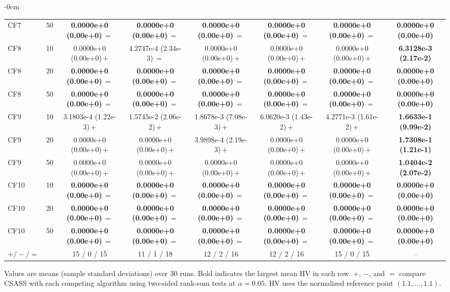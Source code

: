 \begin{table}[!htbp]
\begin{ROneBlock}
\begin{adjustwidth}{-\extralength}{0cm}
\begin{tabular*}{\linewidth}{@{\extracolsep{\fill}}llcccccc@{}}
CF7 & 50 & \textbf{0.0000e+0 (0.00e+0)}\,$=$ & \textbf{0.0000e+0 (0.00e+0)}\,$=$ & \textbf{0.0000e+0 (0.00e+0)}\,$=$ & \textbf{0.0000e+0 (0.00e+0)}\,$=$ & \textbf{0.0000e+0 (0.00e+0)}\,$=$ & \textbf{0.0000e+0 (0.00e+0)} \\
CF8 & 10 & 0.0000e+0 (0.00e+0)\,$+$ & 4.2747e-4 (2.34e-3)\,$=$ & 0.0000e+0 (0.00e+0)\,$+$ & 0.0000e+0 (0.00e+0)\,$+$ & 0.0000e+0 (0.00e+0)\,$+$ & \textbf{6.3128e-3 (2.17e-2)} \\
CF8 & 20 & \textbf{0.0000e+0 (0.00e+0)}\,$=$ & \textbf{0.0000e+0 (0.00e+0)}\,$=$ & \textbf{0.0000e+0 (0.00e+0)}\,$=$ & \textbf{0.0000e+0 (0.00e+0)}\,$=$ & \textbf{0.0000e+0 (0.00e+0)}\,$=$ & \textbf{0.0000e+0 (0.00e+0)} \\
CF8 & 50 & \textbf{0.0000e+0 (0.00e+0)}\,$=$ & \textbf{0.0000e+0 (0.00e+0)}\,$=$ & \textbf{0.0000e+0 (0.00e+0)}\,$=$ & \textbf{0.0000e+0 (0.00e+0)}\,$=$ & \textbf{0.0000e+0 (0.00e+0)}\,$=$ & \textbf{0.0000e+0 (0.00e+0)} \\
CF9 & 10 & 3.1803e-4 (1.22e-3)\,$+$ & 1.5745e-2 (2.06e-2)\,$+$ & 1.8678e-3 (7.08e-3)\,$+$ & 6.0620e-3 (1.43e-2)\,$+$ & 4.2771e-3 (1.61e-2)\,$+$ & \textbf{1.6633e-1 (9.99e-2)} \\
CF9 & 20 & 0.0000e+0 (0.00e+0)\,$+$ & 0.0000e+0 (0.00e+0)\,$+$ & 3.9898e-4 (2.19e-3)\,$+$ & 0.0000e+0 (0.00e+0)\,$+$ & 0.0000e+0 (0.00e+0)\,$+$ & \textbf{1.7308e-1 (1.21e-1)} \\
CF9 & 50 & 0.0000e+0 (0.00e+0)\,$+$ & 0.0000e+0 (0.00e+0)\,$+$ & 0.0000e+0 (0.00e+0)\,$+$ & 0.0000e+0 (0.00e+0)\,$+$ & 0.0000e+0 (0.00e+0)\,$+$ & \textbf{1.0404e-2 (2.07e-2)} \\
CF10 & 10 & \textbf{0.0000e+0 (0.00e+0)}\,$=$ & \textbf{0.0000e+0 (0.00e+0)}\,$=$ & \textbf{0.0000e+0 (0.00e+0)}\,$=$ & \textbf{0.0000e+0 (0.00e+0)}\,$=$ & \textbf{0.0000e+0 (0.00e+0)}\,$=$ & \textbf{0.0000e+0 (0.00e+0)} \\
CF10 & 20 & \textbf{0.0000e+0 (0.00e+0)}\,$=$ & \textbf{0.0000e+0 (0.00e+0)}\,$=$ & \textbf{0.0000e+0 (0.00e+0)}\,$=$ & \textbf{0.0000e+0 (0.00e+0)}\,$=$ & \textbf{0.0000e+0 (0.00e+0)}\,$=$ & \textbf{0.0000e+0 (0.00e+0)} \\
CF10 & 50 & \textbf{0.0000e+0 (0.00e+0)}\,$=$ & \textbf{0.0000e+0 (0.00e+0)}\,$=$ & \textbf{0.0000e+0 (0.00e+0)}\,$=$ & \textbf{0.0000e+0 (0.00e+0)}\,$=$ & \textbf{0.0000e+0 (0.00e+0)}\,$=$ & \textbf{0.0000e+0 (0.00e+0)} \\
\midrule
$+/-/=$ & & 15 / 0 / 15 & 11 / 1 / 18 & 12 / 2 / 16 & 12 / 2 / 16 & 15 / 0 / 15 & -- \\
\bottomrule
\end{tabular*}
\vspace{3pt}
\parbox{\linewidth}{\footnotesize Values are means (sample standard deviations) over 30 runs. Bold indicates the largest mean HV in each row. $+$, $-$, and $=$ compare CSASS with each competing algorithm using two-sided rank-sum tests at $\alpha=0.05$. HV uses the normalized reference point $(1.1,\ldots,1.1)$.}
\end{adjustwidth}
\end{ROneBlock}
\end{table}
